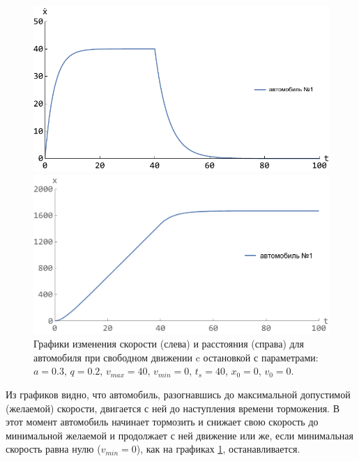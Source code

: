 \documentclass[12pt, a4paper]{extarticle}
\numberwithin{equation}{section}
\numberwithin{figure}{section}
\begin{document}
\begin{figure}[h!]
	\begin{center}
		\begin{minipage}[h!]{0.48\linewidth}
			\includegraphics[width=1\linewidth,height=0.2\textheight]
			{Images/free_drive_speed_with_stop.pdf}
		\end{minipage}
		\hfill 
		\begin{minipage}[h!]{0.48\linewidth}
			\includegraphics[width=1\linewidth,height=0.2\textheight]
			{Images/free_drive_distance_with_stop.pdf}
		\end{minipage}
		\caption{Графики изменения скорости (слева) и расстояния (справа) для автомобиля при свободном движении c остановкой с параметрами: $a=0.3$, $q=0.2$, $v_{max}=40$, $v_{min}=0$, $t_s=40$, $x_0=0$, $v_0=0$.}
		\label{free_drive_with_stop}
	\end{center}
\end{figure}

Из графиков видно, что автомобиль, разогнавшись до максимальной допустимой (желаемой) скорости, двигается с ней до наступления времени торможения. В этот момент автомобиль начинает тормозить и снижает свою скорость до минимальной желаемой и продолжает с ней движение или же, если минимальная скорость равна нулю ($v_{min}=0$), как на графиках \ref{free_drive_with_stop}, останавливается.
 
\end{document}
